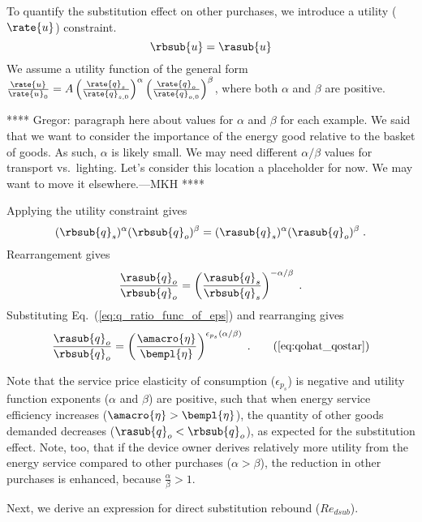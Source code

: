 To quantify the substitution effect on other purchases,
we introduce a utility ($\rate{u}$) constraint.
%
\begin{equation}
  \rbsub{u} = \rasub{u}
\end{equation}
%
We assume a utility function of the general form
$\frac{\rate{u}}{\rate{u}_0}
      = A \left( \frac{\rate{q}_s}{\rate{q}_{s,0}} \right)^\alpha \left( \frac{\rate{q}_o}{\rate{q}_{o,0}} \right)^\beta$,
where both $\alpha$ and $\beta$ are positive.

****
Gregor: paragraph here about values for $\alpha$ and $\beta$ for each example.
We said that we want to consider the importance of the energy good relative to the basket of goods. 
As such, $\alpha$ is likely small. 
We may need different $\alpha/\beta$ values for transport vs.\ lighting.
Let's consider this location a placeholder for now.
We may want to move it elsewhere.---MKH
****

Applying the utility constraint gives
%
\begin{equation}
  (\rbsub{q}_s)^\alpha (\rbsub{q}_o)^\beta = (\rasub{q}_s)^\alpha (\rasub{q}_o)^\beta \; .
\end{equation}
%
Rearrangement gives
%
\begin{equation}
  \frac{\rasub{q}_o}{\rbsub{q}_o} = \left( \frac{\rasub{q}_s}{\rbsub{q}_s} \right) ^ {- \alpha / \beta} \; .
\end{equation}
%
Substituting Eq.~(\ref{eq:q_ratio_func_of_eps}) and rearranging gives
%
\begin{equation}
  \frac{\rasub{q}_o}{\rbsub{q}_o} = \left( \frac{\amacro{\eta}}{\bempl{\eta}}\right) ^ {\epsilon_{p_s} (\alpha / \beta)} \; . 
                                                                                              \tag{\ref{eq:qohat_qostar}}
\end{equation}

Note that the service price elasticity of consumption ($\epsilon_{p_s}$)
is negative and utility function exponents ($\alpha$ and $\beta$) are positive, such that
when energy service efficiency increases ($\amacro{\eta} > \bempl{\eta}$),
the quantity of other goods demanded decreases ($\rasub{q}_o < \rbsub{q}_o$),
as expected for the substitution effect.
Note, too, that if the device owner derives relatively more utility
from the energy service compared to other purchases ($\alpha > \beta$),
the reduction in other purchases is enhanced, because $\frac{\alpha}{\beta} > 1$.

Next, we derive an expression for direct substitution rebound ($Re_{dsub}$).


